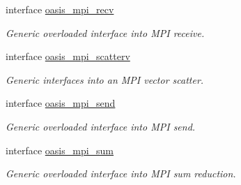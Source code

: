 \begin{DoxyCompactItemize}
interface \hyperlink{interfacemod__oasis__mpi_1_1oasis__mpi__recv}{oasis\+\_\+mpi\+\_\+recv}
\begin{DoxyCompactList}\small\item\em Generic overloaded interface into M\+PI receive. \end{DoxyCompactList}\item 
interface \hyperlink{interfacemod__oasis__mpi_1_1oasis__mpi__scatterv}{oasis\+\_\+mpi\+\_\+scatterv}
\begin{DoxyCompactList}\small\item\em Generic interfaces into an M\+PI vector scatter. \end{DoxyCompactList}\item 
interface \hyperlink{interfacemod__oasis__mpi_1_1oasis__mpi__send}{oasis\+\_\+mpi\+\_\+send}
\begin{DoxyCompactList}\small\item\em Generic overloaded interface into M\+PI send. \end{DoxyCompactList}\item 
interface \hyperlink{interfacemod__oasis__mpi_1_1oasis__mpi__sum}{oasis\+\_\+mpi\+\_\+sum}
\begin{DoxyCompactList}\small\item\em Generic overloaded interface into M\+PI sum reduction. \end{DoxyCompactList}\end{DoxyCompactItemize}
